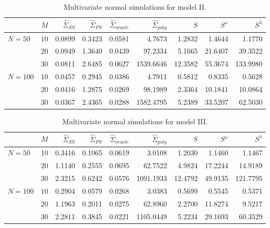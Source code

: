 \begin{table}[H]
\centering
\caption{Multivariate normal simulations for model II.}
\begin{tabular}{lrrrrrrrr}
 & $M$ &$\hat{\Sigma}_{SS}$& $\hat{\Sigma}_{PS}$ &$\hat{\Sigma}_{oracle}$& $\hat{\Sigma}_{poly}$ & $S$ &$S^\omega$& $S^\lambda$ \\ 
  \hline
   $N = 50$ & $10$ & 0.0899 & 0.3423 & 0.0581 & 4.7673 & 1.2832 & 1.4644 & 1.1770 \\ 
   & $20$ & 0.0949 & 1.3640 & 0.0439 & 97.2334 & 5.1665 & 21.6407 & 39.3522 \\ 
     & $30$ & 0.0811 & 2.6485 & 0.0627 & 1539.6646 & 12.3582 & 55.3674 & 133.9980 \\ 
  $N = 100$ & 10 & 0.0457 & 0.2945 & 0.0386 & 4.7911 & 0.5812 & 0.8335 & 0.5628 \\ 
    & $20$ & 0.0416 & 1.2875 & 0.0269 & 98.1989 & 2.3364 & 10.1841 & 10.0864 \\ 
    & $30$ & 0.0367 & 2.4365 & 0.0288 & 1582.4795 & 5.2389 & 33.5207 & 62.5030 \\ 
   \hline
\end{tabular}
\label{table:simulation-1-entropy-loss-sigma-2}
\end{table}
%
%
\begin{table}[H]
\centering
\caption{Multivariate normal simulations for model III.} 
\begin{tabular}{lrrrrrrrr}
 & $M$ &$\hat{\Sigma}_{SS}$& $\hat{\Sigma}_{PS}$ &$\hat{\Sigma}_{oracle}$& $\hat{\Sigma}_{poly}$ & $S$ &$S^\omega$& $S^\lambda$ \\ 
   \hline
 $N = 50$ & 10 & 0.3416 & 0.1065 & 0.0619 & 3.0108 & 1.2030 & 1.1460 & 1.1467 \\ 
      & $20$ & 1.1140 & 0.2555 & 0.0695 & 62.7522 & 4.9824 & 17.2244 & 14.9189 \\ 
    & $30$ & 2.3215 & 0.6242 & 0.0576 & 1091.1933 & 12.4792 & 49.9135 & 121.7795 \\ 
     $N = 100$ & $10$ & 0.2904 & 0.0579 & 0.0268 & 3.0383 & 0.5699 & 0.5545 & 0.5371 \\ 
     & $20$ & 1.1963 & 0.2011 & 0.0275 & 62.8960 & 2.2700 & 11.8274 & 9.5217 \\ 
    & $30$ & 2.2811 & 0.3845 & 0.0221 & 1105.0449 & 5.2234 & 29.1693 & 60.3529 \\ 
   \hline
\end{tabular}
\label{table:simulation-1-entropy-loss-sigma-3}
\end{table}

